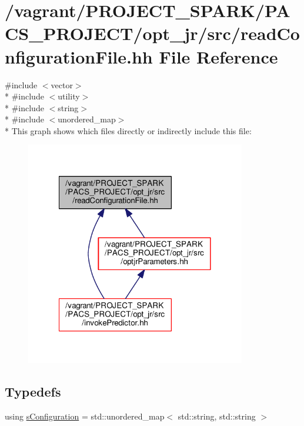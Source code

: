 \hypertarget{readConfigurationFile_8hh}{\section{/vagrant/\-P\-R\-O\-J\-E\-C\-T\-\_\-\-S\-P\-A\-R\-K/\-P\-A\-C\-S\-\_\-\-P\-R\-O\-J\-E\-C\-T/opt\-\_\-jr/src/read\-Configuration\-File.hh File Reference}
\label{readConfigurationFile_8hh}
}
{\ttfamily \#include $<$vector$>$}\\*
{\ttfamily \#include $<$utility$>$}\\*
{\ttfamily \#include $<$string$>$}\\*
{\ttfamily \#include $<$unordered\-\_\-map$>$}\\*
This graph shows which files directly or indirectly include this file\-:\nopagebreak
\begin{figure}[H]
\begin{center}
\leavevmode
\includegraphics[width=272pt]{readConfigurationFile_8hh__dep__incl}
\end{center}
\end{figure}
\subsection*{Typedefs}
\begin{DoxyCompactItemize}
\item 
using \hyperlink{readConfigurationFile_8hh_ab8f35b1da3261263c5e9c0e7c8921f5c}{s\-Configuration} = std\-::unordered\-\_\-map$<$ std\-::string, std\-::string $>$
\end{DoxyCompactItemize}
